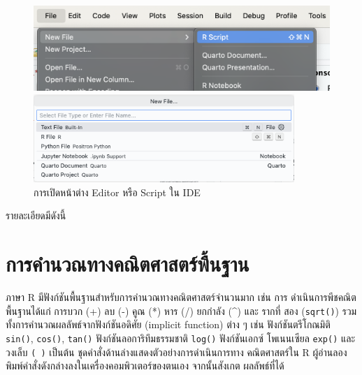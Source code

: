 \documentclass[
  a4paper,
]{book}
\begin{document}
\begin{figure}

\begin{minipage}{0.50\linewidth}

\includegraphics[width=1\textwidth,height=\textheight]{img/02Rscript.png}

\end{minipage}%
%
\begin{minipage}{0.50\linewidth}

\includegraphics[width=0.88\textwidth,height=\textheight]{img/02.R_positron.png}

\end{minipage}%

\caption{\label{fig-IDE}การเปิดหน้าต่าง Editor หรือ Script ใน IDE}

\end{figure}%

รายละเอียดมีดังนี้

\section{การคำนวณทางคณิตศาสตร์พื้นฐาน}\label{uxe01uxe32uxe23uxe04uxe33uxe19uxe27uxe13uxe17uxe32uxe07uxe04uxe13uxe15uxe28uxe32uxe2auxe15uxe23uxe1euxe19uxe10uxe32uxe19}

ภาษา R มีฟังก์ชันพื้นฐานสำหรับการคำนวณทางคณิตศาสตร์จำนวนมาก เช่น การ
ดำเนินการพีชคณิตพื้นฐานได้แก่ การบวก (+) ลบ (-) คูณ (*) หาร (/) ยกกำลัง (\^{})
และ รากที่ สอง (\texttt{sqrt()}) รวมทั้งการคำนวณผลลัพธ์จากฟังก์ชันอดิศัย (implicit
function) ต่าง ๆ เช่น ฟังก์ชันตรีโกณมิติ \texttt{sin()}, \texttt{cos()},
\texttt{tan()} ฟังก์ชันลอการิทึมธรรมชาติ \texttt{log()} ฟังก์ชันเอกซ์ โพเนนเซียล
\texttt{exp()} และ วงเล็บ \texttt{(\ )} เป็นต้น
ชุดคำสั่งด้านล่างแสดงตัวอย่างการดำเนินการทาง คณิตศาสตร์ใน R
ผู้อ่านลองพิมพ์คำสั่งดังกล่างลงในเครื่องคอมพิวเตอร์ของตนเอง จากนั้นสังเกต ผลลัพธ์ที่ได้
\end{document}

